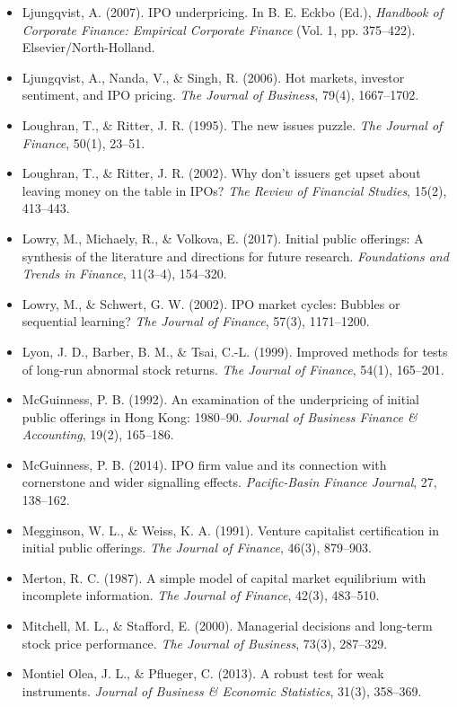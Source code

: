 \documentclass[11pt,letterpaper]{article}
\begin{document}
\begin{itemize}
\item Ljungqvist, A. (2007). IPO underpricing. In B. E. Eckbo (Ed.), \textit{Handbook of Corporate Finance: Empirical Corporate Finance} (Vol. 1, pp. 375–422). Elsevier/North-Holland.
\item Ljungqvist, A., Nanda, V., \& Singh, R. (2006). Hot markets, investor sentiment, and IPO pricing. \textit{The Journal of Business}, 79(4), 1667–1702.
\item Loughran, T., \& Ritter, J. R. (1995). The new issues puzzle. \textit{The Journal of Finance}, 50(1), 23–51.
\item Loughran, T., \& Ritter, J. R. (2002). Why don't issuers get upset about leaving money on the table in IPOs? \textit{The Review of Financial Studies}, 15(2), 413–443.
\item Lowry, M., Michaely, R., \& Volkova, E. (2017). Initial public offerings: A synthesis of the literature and directions for future research. \textit{Foundations and Trends in Finance}, 11(3–4), 154–320.
\item Lowry, M., \& Schwert, G. W. (2002). IPO market cycles: Bubbles or sequential learning? \textit{The Journal of Finance}, 57(3), 1171–1200.
\item Lyon, J. D., Barber, B. M., \& Tsai, C.-L. (1999). Improved methods for tests of long-run abnormal stock returns. \textit{The Journal of Finance}, 54(1), 165–201.
\item McGuinness, P. B. (1992). An examination of the underpricing of initial public offerings in Hong Kong: 1980–90. \textit{Journal of Business Finance \& Accounting}, 19(2), 165–186.
\item McGuinness, P. B. (2014). IPO firm value and its connection with cornerstone and wider signalling effects. \textit{Pacific-Basin Finance Journal}, 27, 138–162.
\item Megginson, W. L., \& Weiss, K. A. (1991). Venture capitalist certification in initial public offerings. \textit{The Journal of Finance}, 46(3), 879–903.
\item Merton, R. C. (1987). A simple model of capital market equilibrium with incomplete information. \textit{The Journal of Finance}, 42(3), 483–510.
\item Mitchell, M. L., \& Stafford, E. (2000). Managerial decisions and long-term stock price performance. \textit{The Journal of Business}, 73(3), 287–329.
\item Montiel Olea, J. L., \& Pflueger, C. (2013). A robust test for weak instruments. \textit{Journal of Business \& Economic Statistics}, 31(3), 358–369.

\end{itemize}
\end{document}
